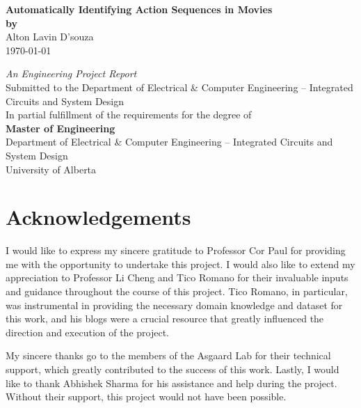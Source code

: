 \documentclass[12pt]{report}
\begin{document}
	\begin{titlepage}
		\centering
		\vspace{3cm}
		{\Huge \textbf{Automatically Identifying Action Sequences in Movies}} \\[2cm]  %
		{\Large \textbf{by}} \\[1cm]  %
		{\Large Alton Lavin D'souza} \\[1cm]  %
		{\Large \today} \\[4cm]  %
		\vfill
		\vfill
		
		\begin{center}
			\textit{An Engineering Project Report} \\[0.2cm]
			Submitted to the Department of Electrical \& Computer Engineering – Integrated Circuits and System Design \\[0.2cm]
			In partial fulfillment of the requirements for the degree of \\[0.2cm]
			\textbf{Master of Engineering} \\[1cm]
			Department of Electrical \& Computer Engineering – Integrated Circuits and System Design \\[0.2cm]
			University of Alberta
		\end{center}
	\end{titlepage}
	
	\setcounter{page}{1}
	\newpage
	\section*{Acknowledgements}
	I would like to express my sincere gratitude to Professor Cor Paul for providing me with the opportunity to undertake this project. I would also like to extend my appreciation to Professor Li Cheng and Tico Romano for their invaluable inputs and guidance throughout the course of this project. Tico Romano, in particular, was instrumental in providing the necessary domain knowledge and dataset for this work, and his blogs were a crucial resource that greatly influenced the direction and execution of the project.
	
	My sincere thanks go to the members of the Asgaard Lab for their technical support, which greatly contributed to the success of this work. Lastly, I would like to thank Abhishek Sharma for his assistance and help during the project. Without their support, this project would not have been possible.
	\newpage
\end{document}
